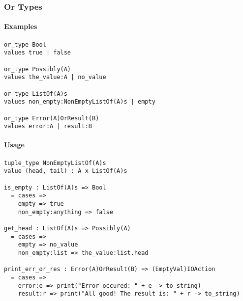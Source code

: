 \documentclass{article}
\begin{document}
\subsubsection{Or Types}
\label{subsubsec:ortypes}

\paragraph{Examples}

\begin{verbatim}
or_type Bool
values true | false

or_type Possibly(A)
values the_value:A | no_value

or_type ListOf(A)s
values non_empty:NonEmptyListOf(A)s | empty

or_type Error(A)OrResult(B)
values error:A | result:B
\end{verbatim}

\paragraph{Usage}

\begin{verbatim}
tuple_type NonEmptyListOf(A)s
value (head, tail) : A x ListOf(A)s

is_empty : ListOf(A)s => Bool
  = cases => 
    empty => true
    non_empty:anything => false

get_head : ListOf(A)s => Possibly(A)
  = cases => 
    empty => no_value
    non_empty:list => the_value:list.head

print_err_or_res : Error(A)OrResult(B) => (EmptyVal)IOAction
  = cases => 
    error:e => print("Error occured: " + e -> to_string)
    result:r => print("All good! The result is: " + r -> to_string)
\end{verbatim}
\end{document}
